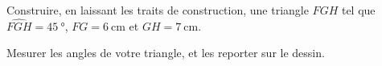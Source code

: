 
\begin{exercice}\label{exosmath-0886}

    Construire, en laissant les traits de construction, une triangle \( FGH\) tel que \( \widehat{FGH}=\SI{45}{\degree}\), \( FG=\SI{6}{\centi\meter}\) et \( GH=\SI{7}{\centi\meter}\).

    Mesurer les angles de votre triangle, et les reporter sur le dessin.

\end{exercice}
